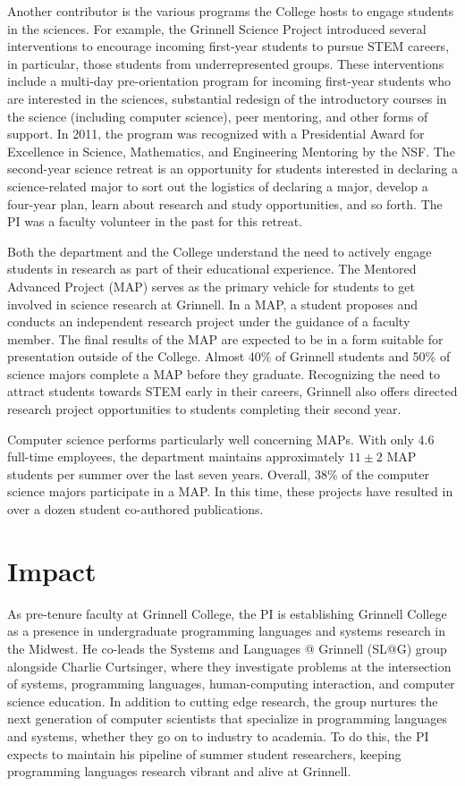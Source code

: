 \documentclass[11pt]{article}
\begin{document}
Another contributor is the various programs the College hosts to engage students in the sciences.
For example, the Grinnell Science Project introduced several interventions to encourage incoming first-year students to pursue STEM careers, in particular, those students from underrepresented groups.
These interventions include a multi-day pre-orientation program for incoming first-year students who are interested in the sciences, substantial redesign of the introductory courses in the science (including computer science), peer mentoring, and other forms of support.
In 2011, the program was recognized with a Presidential Award for Excellence in Science, Mathematics, and Engineering Mentoring by the NSF.
The second-year science retreat is an opportunity for students interested in declaring a science-related major to sort out the logistics of declaring a major, develop a four-year plan, learn about research and study opportunities, and so forth.
The PI was a faculty volunteer in the past for this retreat.

Both the department and the College understand the need to actively engage students in research as part of their educational experience.
The Mentored Advanced Project (MAP) serves as the primary vehicle for students to get involved in science research at Grinnell.
In a MAP, a student proposes and conducts an independent research project under the guidance of a faculty member.
 The final results of the MAP are expected to be in a form suitable for presentation outside of the College.
Almost 40\% of Grinnell students and 50\% of science majors complete a MAP before they graduate.
Recognizing the need to attract students towards STEM early in their careers, Grinnell also offers directed research project opportunities to students completing their second year.

Computer science performs particularly well concerning MAPs.
With only 4.6 full-time employees, the department maintains approximately $11 \pm 2$ MAP students per summer over the last seven years.
Overall, 38\% of the computer science majors participate in a MAP.
In this time, these projects have resulted in over a dozen student co-authored publications.

\section{Impact}

As pre-tenure faculty at Grinnell College, the PI is establishing Grinnell College as a presence in undergraduate programming languages and systems research in the Midwest.
He co-leads the Systems and Languages @ Grinnell (SL@G) group alongside Charlie Curtsinger, where they investigate problems at the intersection of systems, programming languages, human-computing interaction, and computer science education.
In addition to cutting edge research, the group nurtures the next generation of computer scientists that specialize in programming languages and systems, whether they go on to industry to academia.
To do this, the PI expects to maintain his pipeline of summer student researchers, keeping programming languages research vibrant and alive at Grinnell.
\end{document}
